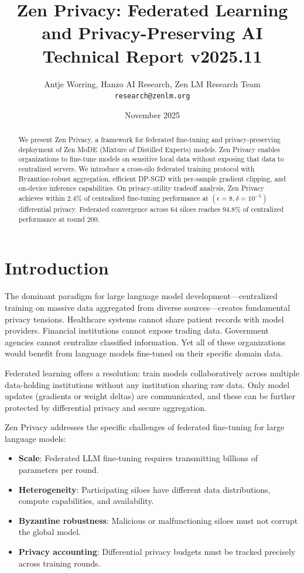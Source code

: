 \documentclass[11pt,a4paper]{article}
\title{\textbf{Zen Privacy: Federated Learning and Privacy-Preserving AI}\\
\large Technical Report v2025.11}
\author{Antje Worring, Hanzo AI Research, Zen LM Research Team\\
\texttt{research@zenlm.org}}
\date{November 2025}
\begin{document}
\maketitle

\begin{abstract}
We present Zen Privacy, a framework for federated fine-tuning and privacy-preserving deployment of Zen MoDE (Mixture of Distilled Experts) models. Zen Privacy enables organizations to fine-tune models on sensitive local data without exposing that data to centralized servers. We introduce a cross-silo federated training protocol with Byzantine-robust aggregation, efficient DP-SGD with per-sample gradient clipping, and on-device inference capabilities. On privacy-utility tradeoff analysis, Zen Privacy achieves within 2.4\% of centralized fine-tuning performance at $(\epsilon=8, \delta=10^{-5})$ differential privacy. Federated convergence across 64 siloes reaches 94.8\% of centralized performance at round 200.
\end{abstract}

\section{Introduction}

The dominant paradigm for large language model development—centralized training on massive data aggregated from diverse sources—creates fundamental privacy tensions. Healthcare systems cannot share patient records with model providers. Financial institutions cannot expose trading data. Government agencies cannot centralize classified information. Yet all of these organizations would benefit from language models fine-tuned on their specific domain data.

Federated learning offers a resolution: train models collaboratively across multiple data-holding institutions without any institution sharing raw data. Only model updates (gradients or weight deltas) are communicated, and these can be further protected by differential privacy and secure aggregation.

Zen Privacy addresses the specific challenges of federated fine-tuning for large language models:

\begin{itemize}
  \item \textbf{Scale}: Federated LLM fine-tuning requires transmitting billions of parameters per round.
  \item \textbf{Heterogeneity}: Participating siloes have different data distributions, compute capabilities, and availability.
  \item \textbf{Byzantine robustness}: Malicious or malfunctioning siloes must not corrupt the global model.
  \item \textbf{Privacy accounting}: Differential privacy budgets must be tracked precisely across training rounds.
\end{itemize}
\end{document}
